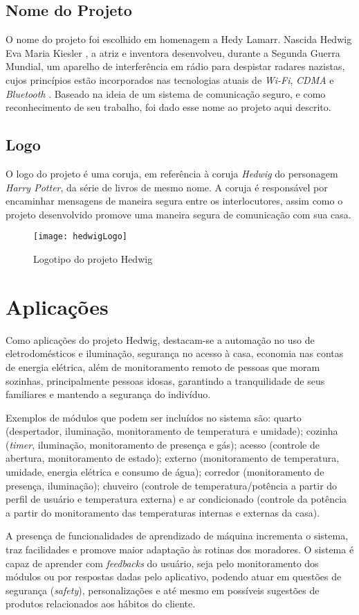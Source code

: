 \subsection{Nome do Projeto}
O nome do projeto foi escolhido em homenagem a Hedy Lamarr. Nascida Hedwig Eva Maria Kiesler \cite{shearer}, a atriz e inventora desenvolveu, durante a Segunda Guerra Mundial, um aparelho de interferência em rádio para despistar radares nazistas, cujos princípios estão incorporados nas tecnologias atuais de \emph{Wi-Fi}, \emph{CDMA} e \emph{Bluetooth} \cite{electronicFrontier}. Baseado na ideia de um sistema de comunicação seguro, e como reconhecimento de seu trabalho, foi dado esse nome ao projeto aqui descrito.

\subsection{Logo}
O logo do projeto é uma coruja, em referência à coruja \textit{Hedwig} do personagem \textit{Harry Potter}, da série de livros de mesmo nome. A coruja é responsável por encaminhar mensagens de maneira segura entre os interlocutores, assim como o projeto desenvolvido promove uma maneira segura de comunicação com sua casa.
\begin{figure}[H]
	\centering
	\caption{Logotipo do projeto Hedwig}
  \texttt{[image: hedwigLogo]}
\label{fig:hedwigLogo}
\end{figure}

\section{Aplicações}
Como aplicações do projeto Hedwig, destacam-se a automação no uso de eletrodomésticos e iluminação, segurança no acesso à casa, economia nas contas de energia elétrica, além de  monitoramento remoto de pessoas que moram sozinhas, principalmente pessoas idosas, garantindo a tranquilidade de seus familiares e mantendo a segurança do indivíduo.

Exemplos de módulos que podem ser incluídos no sistema são: quarto (despertador, iluminação, monitoramento de temperatura e umidade); cozinha (\textit{timer}, iluminação, monitoramento de presença e gás); acesso (controle de abertura, monitoramento de estado); externo (monitoramento de temperatura, umidade, energia elétrica e consumo de água); corredor (monitoramento de presença, iluminação); chuveiro (controle de temperatura\slash potência a partir do perfil de usuário e temperatura externa) e ar condicionado (controle da potência a partir do monitoramento das temperaturas internas e externas da casa).

A presença de funcionalidades de aprendizado de máquina incrementa o sistema, traz facilidades e promove maior adaptação às rotinas dos moradores. O sistema é capaz de aprender com \emph{feedbacks} do usuário, seja pelo monitoramento dos módulos ou por respostas dadas pelo aplicativo, podendo atuar em questões de segurança (\emph{safety}), personalizações e até mesmo em possíveis sugestões de produtos relacionados aos hábitos do cliente.
